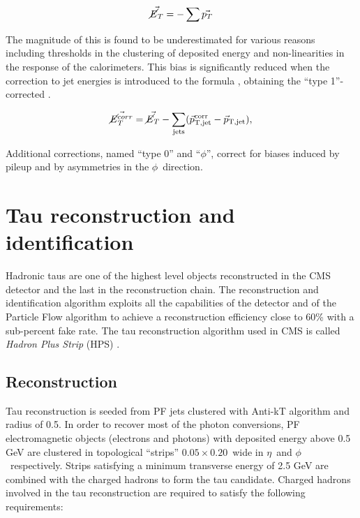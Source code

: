 \begin{equation}
\vec{\cancel{E}_T} = -\sum \vec{p_{T}}
\end{equation}

The magnitude of this \MET is found to be underestimated for various reasons including thresholds in the clustering of deposited energy and non-linearities in the response of the calorimeters. This bias is significantly reduced when the correction to jet energies is introduced to the formula \cite{Chatrchyan:2011ds}, obtaining the ``type 1''-corrected \MET.

\begin{equation}
\vec{\cancel{E}_T^{corr}} = \vec{\cancel{E}_T } - \sum_\mathrm{jets} (\vec{p}_\mathrm{T,jet}^\mathrm{corr}-\vec{p}_\mathrm{T,jet}),
\label{eq:Type1MET}
\end{equation}

Additional corrections, named ``type 0'' and ``$\phi$'', correct for biases induced by pileup and by asymmetries in the $\phi$\ direction.

\section{Tau reconstruction and identification}

Hadronic taus are one of the highest level objects reconstructed in the CMS detector and the last in the reconstruction chain. The reconstruction and identification algorithm exploits all the capabilities of the detector and of the Particle Flow algorithm to achieve a reconstruction efficiency close to 60\% with a sub-percent fake rate. The tau reconstruction algorithm used in CMS is called \emph{Hadron Plus Strip} (HPS) \cite{CMS-PAS-TAU-11-001}. 

\subsection{Reconstruction}

Tau reconstruction is seeded from PF jets clustered with Anti-kT algorithm and radius of 0.5. In order to recover most of the photon conversions, PF electromagnetic objects (electrons and photons) with deposited energy above 0.5 GeV are clustered in topological ``strips'' $0.05 \times 0.20$\ wide in $\eta$\ and $\phi$\ respectively. Strips satisfying a minimum transverse energy of 2.5 GeV are combined with the charged hadrons to form the tau candidate. Charged hadrons involved in the tau reconstruction are required to satisfy the following requirements:

